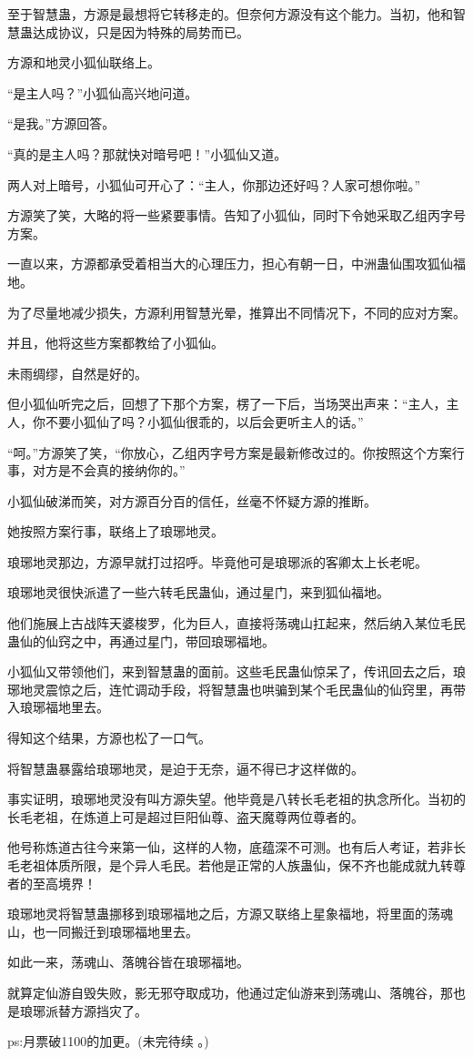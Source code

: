 \begin{this_body}
至于智慧蛊，方源是最想将它转移走的。但奈何方源没有这个能力。当初，他和智慧蛊达成协议，只是因为特殊的局势而已。

方源和地灵小狐仙联络上。

“是主人吗？”小狐仙高兴地问道。

“是我。”方源回答。

“真的是主人吗？那就快对暗号吧！”小狐仙又道。

两人对上暗号，小狐仙可开心了：“主人，你那边还好吗？人家可想你啦。”

方源笑了笑，大略的将一些紧要事情。告知了小狐仙，同时下令她采取乙组丙字号方案。

一直以来，方源都承受着相当大的心理压力，担心有朝一日，中洲蛊仙围攻狐仙福地。

为了尽量地减少损失，方源利用智慧光晕，推算出不同情况下，不同的应对方案。

并且，他将这些方案都教给了小狐仙。

未雨绸缪，自然是好的。

但小狐仙听完之后，回想了下那个方案，楞了一下后，当场哭出声来：“主人，主人，你不要小狐仙了吗？小狐仙很乖的，以后会更听主人的话。”

“呵。”方源笑了笑，“你放心，乙组丙字号方案是最新修改过的。你按照这个方案行事，对方是不会真的接纳你的。”

小狐仙破涕而笑，对方源百分百的信任，丝毫不怀疑方源的推断。

她按照方案行事，联络上了琅琊地灵。

琅琊地灵那边，方源早就打过招呼。毕竟他可是琅琊派的客卿太上长老呢。

琅琊地灵很快派遣了一些六转毛民蛊仙，通过星门，来到狐仙福地。

他们施展上古战阵天婆梭罗，化为巨人，直接将荡魂山扛起来，然后纳入某位毛民蛊仙的仙窍之中，再通过星门，带回琅琊福地。

小狐仙又带领他们，来到智慧蛊的面前。这些毛民蛊仙惊呆了，传讯回去之后，琅琊地灵震惊之后，连忙调动手段，将智慧蛊也哄骗到某个毛民蛊仙的仙窍里，再带入琅琊福地里去。

得知这个结果，方源也松了一口气。

将智慧蛊暴露给琅琊地灵，是迫于无奈，逼不得已才这样做的。

事实证明，琅琊地灵没有叫方源失望。他毕竟是八转长毛老祖的执念所化。当初的长毛老祖，在炼道上可是超过巨阳仙尊、盗天魔尊两位尊者的。

他号称炼道古往今来第一仙，这样的人物，底蕴深不可测。也有后人考证，若非长毛老祖体质所限，是个异人毛民。若他是正常的人族蛊仙，保不齐也能成就九转尊者的至高境界！

琅琊地灵将智慧蛊挪移到琅琊福地之后，方源又联络上星象福地，将里面的荡魂山，也一同搬迁到琅琊福地里去。

如此一来，荡魂山、落魄谷皆在琅琊福地。

就算定仙游自毁失败，影无邪夺取成功，他通过定仙游来到荡魂山、落魄谷，那也是琅琊派替方源挡灾了。

ps:月票破1100的加更。(未完待续 。)

\end{this_body}


